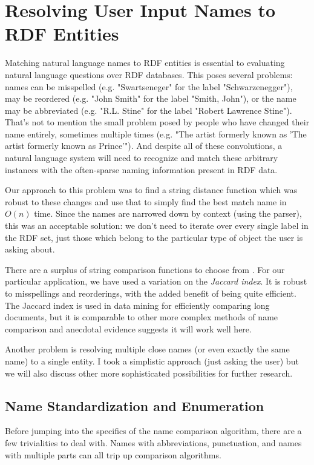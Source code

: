 \documentclass[11pt]{article}
\begin{document}
\section{Resolving User Input Names to RDF Entities}

Matching natural language names to RDF entities is essential to evaluating
natural language questions over RDF databases. This poses several problems:
names can be misspelled (e.g. "Swartseneger" for the label "Schwarzenegger"), 
may be reordered (e.g. "John Smith" for the label "Smith, John"),
or the name may be abbreviated (e.g. "R.L. Stine" for the label "Robert Lawrence Stine").
That's not to mention the small problem posed by people who have
changed their name entirely, sometimes multiple times
(e.g. "The artist formerly known as 'The artist formerly known as Prince'").
And despite all of these convolutions, a natural language system will need to
recognize and match these arbitrary instances with the often-sparse naming information
present in RDF data.

Our approach to this problem was to find a string distance function which was
robust to these changes and use that to simply
find the best match name in $O(n)$ time. Since the names are narrowed down by
context (using the parser), this was an acceptable solution: we don't need to iterate
over every single label in the RDF set, just those which belong to the particular
type of object the user is asking about.

There are a surplus of string comparison functions to choose from \cite{comparison}.
For our particular application, we have used a variation on the {\em Jaccard index}.
It is robust to misspellings and reorderings, with the added benefit of being quite efficient.
The Jaccard index is used in data mining for efficiently comparing long documents,
but it is comparable to other more complex methods of name comparison \cite{comparison} and 
anecdotal evidence suggests it will work well here.

Another problem is resolving multiple close names (or even exactly the same name) to a single entity.
I took a simplistic approach (just asking the user) but we will also discuss other more
sophisticated possibilities for further research. 

\subsection{Name Standardization and Enumeration}
Before jumping into the specifics of the name comparison algorithm, there are a few trivialities
to deal with. Names with abbreviations, punctuation, and names with multiple parts can all
trip up comparison algorithms.
\end{document}
